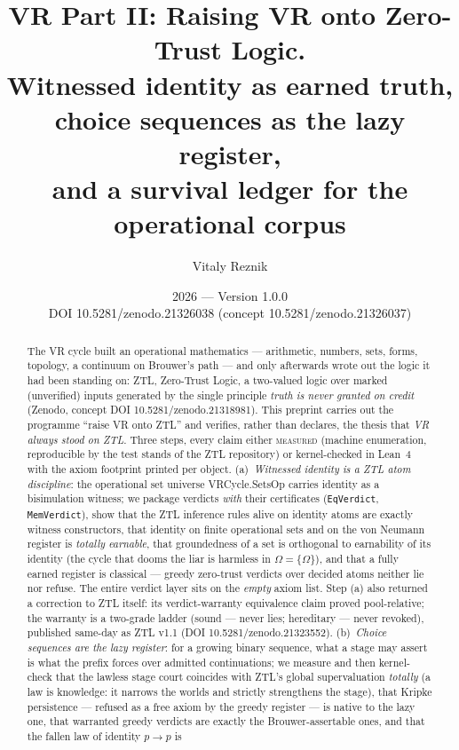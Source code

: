 \documentclass[11pt]{article}
\title{\textbf{VR Part II: Raising VR onto Zero-Trust Logic.}\\[2pt]
\large Witnessed identity as earned truth, choice sequences as the lazy
register,\\ and a survival ledger for the operational corpus}
\author{Vitaly Reznik}
\date{2026 --- Version 1.0.0\\[2pt]
\normalsize DOI 10.5281/zenodo.21326038 (concept 10.5281/zenodo.21326037)}
\theoremstyle{remark}
\newcommand{\MEASURED}{\textsc{measured}}
\begin{document}
\maketitle

\begin{abstract}
The VR cycle built an operational mathematics --- arithmetic, numbers, sets,
forms, topology, a continuum on Brouwer's path --- and only afterwards wrote
out the logic it had been standing on: ZTL, Zero-Trust Logic, a two-valued
logic over marked (unverified) inputs generated by the single principle
\emph{truth is never granted on credit} (Zenodo, concept DOI
10.5281/zenodo.21318981). This preprint carries out the programme ``raise VR
onto ZTL'' and verifies, rather than declares, the thesis that \emph{VR
always stood on ZTL}. Three steps, every claim either \MEASURED{} (machine
enumeration, reproducible by the test stands of the ZTL repository) or
kernel-checked in Lean~4 with the axiom footprint printed per object.
(a)~\emph{Witnessed identity is a ZTL atom discipline}: the operational
set universe \textsf{VRCycle.SetsOp} carries identity as a bisimulation
witness; we package verdicts \emph{with} their certificates
(\texttt{EqVerdict}, \texttt{MemVerdict}), show that the ZTL inference rules
alive on identity atoms are exactly witness constructors, that identity on
finite operational sets and on the von Neumann register is \emph{totally
earnable}, that groundedness of a set is orthogonal to earnability of its
identity (the cycle that dooms the liar is harmless in $\Omega=\{\Omega\}$),
and that a fully earned register is classical --- greedy zero-trust verdicts
over decided atoms neither lie nor refuse. The entire verdict layer sits on
the \emph{empty} axiom list. Step (a) also returned a correction to ZTL
itself: its verdict-warranty equivalence claim proved pool-relative; the
warranty is a two-grade ladder (sound --- never lies; hereditary --- never
revoked), published same-day as ZTL v1.1 (DOI 10.5281/zenodo.21323552).
(b)~\emph{Choice sequences are the lazy register}: for a growing binary
sequence, what a stage may assert is what the prefix forces over admitted
continuations; we measure and then kernel-check that the lawless stage court
coincides with ZTL's global supervaluation \emph{totally} (a law is
knowledge: it narrows the worlds and strictly strengthens the stage), that
Kripke persistence --- refused as a free axiom by the greedy register --- is
native to the lazy one, that warranted greedy verdicts are exactly the
Brouwer-assertable ones, and that the fallen law of identity $p\to p$ is

\end{abstract}
\end{document}
